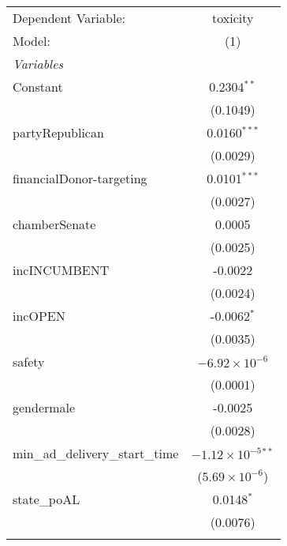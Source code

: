 
\begingroup
\centering
\begin{tabular}{lc}
   \tabularnewline \midrule \midrule
   Dependent Variable:                                & toxicity\\  
   Model:                                             & (1)\\  
   \midrule
   \emph{Variables}\\
   Constant                                           & 0.2304$^{**}$\\   
                                                      & (0.1049)\\   
   partyRepublican                                    & 0.0160$^{***}$\\   
                                                      & (0.0029)\\   
   financialDonor-targeting                           & 0.0101$^{***}$\\   
                                                      & (0.0027)\\   
   chamberSenate                                      & 0.0005\\   
                                                      & (0.0025)\\   
   incINCUMBENT                                       & -0.0022\\   
                                                      & (0.0024)\\   
   incOPEN                                            & -0.0062$^{*}$\\   
                                                      & (0.0035)\\   
   safety                                             & $-6.92\times 10^{-6}$\\    
                                                      & (0.0001)\\   
   gendermale                                         & -0.0025\\   
                                                      & (0.0028)\\   
   min\_ad\_delivery\_start\_time                     & $-1.12\times 10^{-5}$$^{**}$\\    
                                                      & ($5.69\times 10^{-6}$)\\    
   state\_poAL                                        & 0.0148$^{*}$\\   
                                                      & (0.0076)\\   
$$
\end{tabular}
